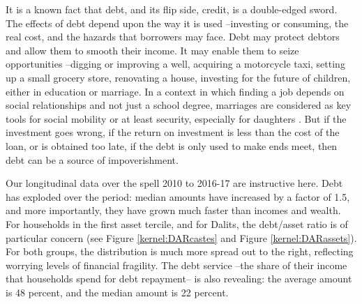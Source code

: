 \documentclass[a4paper, 11pt, onecolumn]{article}
\begin{document}
It is a known fact that debt, and its flip side, credit, is a double-edged sword. 
The effects of debt depend upon the way it is used --investing or consuming, the real cost, and the hazards that borrowers may face. 
Debt may protect debtors and allow them to smooth their income. 
It may enable them to seize opportunities --digging or improving a well, acquiring a motorcycle taxi, setting up a small grocery store, renovating a house, investing for the future of children, either in education or marriage. 
In a context in which finding a job depends on social relationships and not just a school degree, marriages are considered as key tools for social mobility or at least security, especially for daughters \citep{DeNeve2016}. 
But if the investment goes wrong, if the return on investment is less than the cost of the loan, or is obtained too late, if the debt is only used to make ends meet, then debt can be a source of impoverishment. 

Our longitudinal data over the spell 2010 to 2016-17 are instructive here.
Debt has exploded over the period: median amounts have increased by a factor of 1.5, and more importantly, they have grown much faster than incomes and wealth. 
For households in the first asset tercile, and for Dalits, the debt/asset ratio is of particular concern (see Figure \ref{kernel:DARcastes} and Figure \ref{kernel:DARassets}). 
For both groups, the distribution is much more spread out to the right, reflecting worrying levels of financial fragility. 
The debt service --the share of their income that households spend for debt repayment-- is also revealing: the average amount is 48 percent, and the median amount is 22 percent. 
\end{document}
